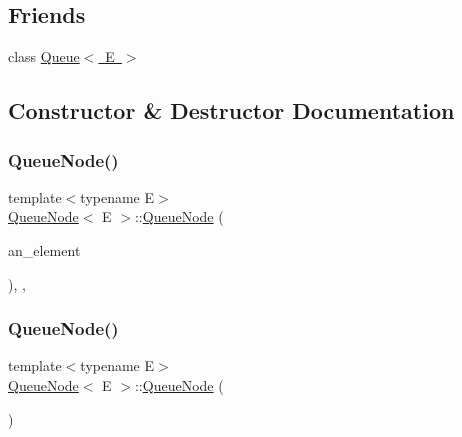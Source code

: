 \subsection*{Friends}
\begin{DoxyCompactItemize}
\item 
class \mbox{\hyperlink{class_queue_node_ad4336229b1d7c3626e4ba69f236b202d}{Queue$<$ E $>$}}
\end{DoxyCompactItemize}


\subsection{Constructor \& Destructor Documentation}
\mbox{\label{class_queue_node_a2c22feef35d910bec7138598e8784e25}} 
\subsubsection{\texorpdfstring{QueueNode()}{QueueNode()}\hspace{0.1cm}{\footnotesize\ttfamily [1/6]}}
{\footnotesize\ttfamily template$<$typename E$>$ \\
\mbox{\hyperlink{class_queue_node}{Queue\+Node}}$<$ E $>$\+::\mbox{\hyperlink{class_queue_node}{Queue\+Node}} (\begin{DoxyParamCaption}\item[{const E \&}]{an\+\_\+element }\end{DoxyParamCaption})\hspace{0.3cm}{\ttfamily [inline]}, {\ttfamily [explicit]}, {\ttfamily [private]}}

\mbox{\label{class_queue_node_a35adcad7a84db46784907cf58106d585}} 
\subsubsection{\texorpdfstring{QueueNode()}{QueueNode()}\hspace{0.1cm}{\footnotesize\ttfamily [2/6]}}
{\footnotesize\ttfamily template$<$typename E$>$ \\
\mbox{\hyperlink{class_queue_node}{Queue\+Node}}$<$ E $>$\+::\mbox{\hyperlink{class_queue_node}{Queue\+Node}} (\begin{DoxyParamCaption}\item[{const \mbox{\hyperlink{class_queue_node}{Queue\+Node}}$<$ E $>$ \&}]{ }\end{DoxyParamCaption})\hspace{0.3cm}{\ttfamily [private]}}

